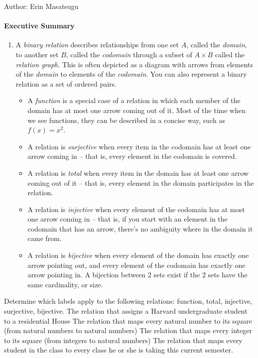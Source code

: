 \documentclass[solution, letterpaper]{cs20inclass}
\begin{document}

\noindent Author: Erin Masatsugu

\paragraph*{Executive Summary}
\begin{enumerate}
\item A {\em binary relation} describes relationships from one set $A$, called the {\em domain}, to another set $B$, called the {\em codomain} through a subset of $A \times B$ called the {\em relation graph}.  This is often depicted as a diagram with arrows from elements of the {\em domain} to elements of the {\em codomain}. You can also represent a binary relation as a set of ordered pairs.
\begin{itemize}
\item A {\em function} is a special case of a relation in which each member of the domain has at most one arrow coming out of it.  Most of the time when we see functions, they can be described in a concise way, such as $f(x) = x^2$.
\item A relation is {\em surjective} when every item in the codomain has at least one arrow coming in -- that is, every element in the codomain is covered.
\item A relation is {\em total} when every item in the domain has at least one arrow coming out of it -- that is, every element in the domain participates in the relation.
\item A relation is {\em injective} when every element of the codomain has at most one arrow coming in -- that is, if you start with an element in the codomain that has an arrow, there's no ambiguity where in the domain it came from.
\item A relation is {\em bijective} when every element of the domain has exactly one arrow pointing out, and every element of the codomain has exactly one arrow pointing in. A bijection between 2 sets exist if the 2 sets have the same cardinality, or size.
\end{itemize}
\end{enumerate}

\pagebreak

\problem Determine which labels apply to the following relations: function, total, injective, surjective, bijective.
\subproblem The relation that assigns a Harvard undergraduate student to a residential House
\subproblem The relation that maps every natural number to its square (from natural numbers to natural numbers)
\subproblem The relation that maps every integer to its square (from integers to natural numbers)
\subproblem The relation that maps every student in the class to every class he or she is taking this current semester.
\end{document}
